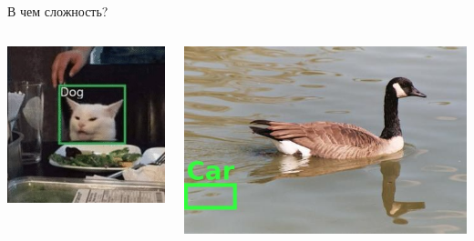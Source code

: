 \documentclass[aspectratio=169]{beamer}
\begin{document}
\begin{frame}{В чем сложность?}
    \begin{columns}
        \begin{column}{.33\linewidth}
            \includegraphics[width=\linewidth]{graphs/fig4_0.jpg}
        \end{column}
        \pause{}
        \begin{column}{.33\linewidth}
            \includegraphics[width=\linewidth]{graphs/fig4_1.jpg}
        \end{column}

\end{columns}
\end{frame}
\end{document}
